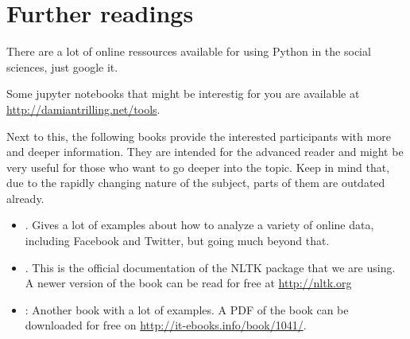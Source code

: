 \documentclass[a4paper,12pt]{report}
\begin{document}
\section*{Further readings}
There are a lot of online ressources available for using Python in the social sciences, just google it. 

Some jupyter notebooks that might be interestig for you are available at \url{http://damiantrilling.net/tools}.
%
%


Next to this, the following books provide the interested participants with more and deeper information. They are intended for the advanced reader and might be very useful for those who want to go deeper into the topic. Keep in mind that, due to the rapidly changing nature of the subject, parts of them are outdated already.

\begin{itemize}
	\item \citealp{Russel2013}. Gives a lot of examples about how to analyze a variety of online data, including Facebook and Twitter, but going much beyond that.
	\item \citealp{Bird2009}. This is the official documentation of the NLTK package that we are using. A newer version of the book can be read for free at \url{http://nltk.org}
	\item \citealp{McKinney2012}: Another book with a lot of examples. A PDF of the book can be downloaded for free on \url{http://it-ebooks.info/book/1041/}.
\end{itemize}







\end{document}
